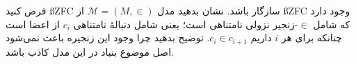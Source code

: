 فرض کنید
\ss{ZFC}
سازگار باشد.
نشان بدهید مدل
$\mathcal{M}=(M,\in)$
از
\ss{ZFC}
وجود دارد که شامل
$\in$-زنجیر
نزولی نامتناهی است؛ یعنی شامل دنبالهٔ نامتناهی
$c_i$
از اعضا است چنانکه برای هر
$i$
داریم
$c_i\in c_{i+1}$.
توضیح بدهید چرا وجود این زنجیره باعث نمی‌شود اصل موضوع بنیاد در این مدل کاذب باشد.